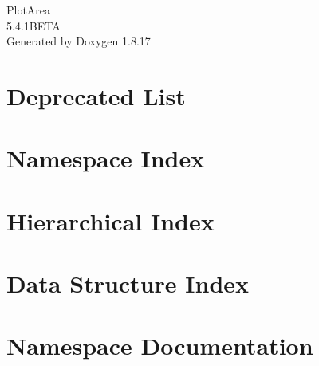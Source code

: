 \let\mypdfximage\pdfximage\def\pdfximage{\immediate\mypdfximage}\documentclass[twoside]{book}
\newcommand{\+}{\discretionary{\mbox{\scriptsize$\hookleftarrow$}}{}{}}
\newcommand{\clearemptydoublepage}{%
  \newpage{\pagestyle{empty}\cleardoublepage}%
}
\begin{document}
\hypersetup{pageanchor=false,
             bookmarksnumbered=true,
             pdfencoding=unicode
            }
\begin{titlepage}
\vspace*{7cm}
\begin{center}%
{\Large Plot\+Area \\[1ex]\large 5.\+4.\+1\+B\+E\+TA }\\
\vspace*{1cm}
{\large Generated by Doxygen 1.8.17}\\
\end{center}
\end{titlepage}
\clearemptydoublepage
{}
\tableofcontents
\clearemptydoublepage
{}
\hypersetup{pageanchor=true}

\chapter{Deprecated List}
\label{deprecated}

\chapter{Namespace Index}

\chapter{Hierarchical Index}

\chapter{Data Structure Index}

\chapter{Namespace Documentation}



\end{document}
